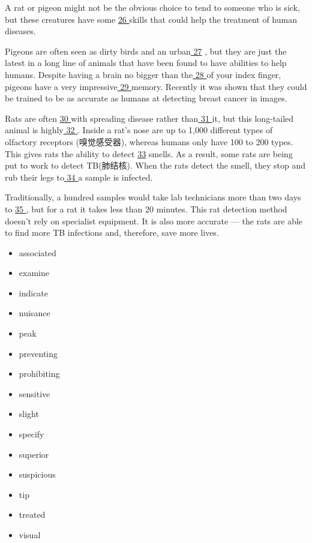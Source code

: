 \documentclass[UTF8,11pt]{ctexart}
\begin{document}
A rat or pigeon might not be the obvious choice to tend to someone who is sick, but these creatures have some \uline{26 }skills that could help the treatment of human diseases.


Pigeons are often seen as dirty birds and an urban\uline{ 27} , but they are just the latest in a long line of animals that have been found to have abilities to help humans. Despite having a brain no bigger than the\uline{ 28 }of your index finger, pigeons have a very impressive\uline{ 29 }memory. Recently it was shown that they could be trained to be as accurate as humans at detecting breast cancer in images.


Rats are often \uline{30 }with spreading disease rather than\uline{ 31 }it, but this long-tailed animal is highly\uline{ 32 }. Inside a rat's nose are up to 1,000 different types of olfactory receptors (嗅觉感受器), whereas humans only have 100 to 200 types. This gives rats the ability to detect \uline{33} smells. As a result, some rats are being put to work to detect TB(肺结核). When the rats detect the smell, they stop and rub their legs to\uline{ 34 }a sample is infected.


Traditionally, a hundred samples would take lab technicians more than two days to \uline{35 }, but for a rat it takes less than 20 minutes. This rat detection method doesn't rely on specialist equipment. It is also more accurate — the rats are able to find more TB infections and, therefore, save more lives.


\begin{itemize}[leftmargin=2em,itemsep=.2em,topsep=.4em]\item[A.] associated
\item[B.] examine
\item[C.] indicate
\item[D.] nuisance
\item[E.] peak
\item[F.] preventing
\item[G.] prohibiting
\item[H.] sensitive
\item[I.] slight
\item[J.] specify
\item[K.] superior
\item[L.] suspicious
\item[M.] tip
\item[N.] treated
\item[O.] visual
\end{itemize}
\end{document}
